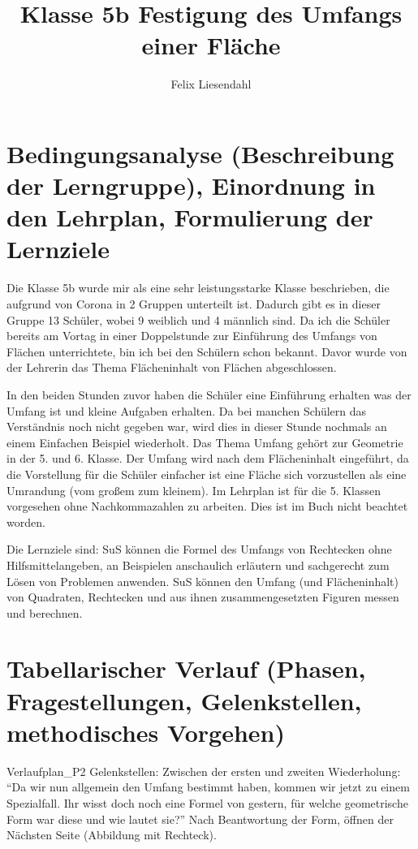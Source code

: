 \documentclass[11pt]{scrartcl}
\title{Klasse 5b Festigung des Umfangs einer Fläche}
\author{Felix Liesendahl}
\begin{document}
\maketitle
\tableofcontents
\newpage

\section{Bedingungsanalyse (Beschreibung der Lerngruppe), Einordnung in den Lehrplan, Formulierung der Lernziele}
Die Klasse 5b wurde mir als eine sehr leistungsstarke Klasse beschrieben, die aufgrund von Corona in 2 Gruppen unterteilt ist. Dadurch gibt es in dieser Gruppe 13 Schüler, wobei 9 weiblich und 4 männlich sind.
Da ich die Schüler bereits am Vortag in einer Doppelstunde zur Einführung des Umfangs von Flächen unterrichtete, bin ich bei den Schülern schon bekannt. Davor wurde von der Lehrerin das Thema Flächeninhalt von Flächen abgeschlossen.

In den beiden Stunden zuvor haben die Schüler eine Einführung erhalten was der Umfang ist und kleine Aufgaben erhalten. Da bei manchen Schülern das Verständnis noch nicht gegeben war, wird dies in dieser Stunde nochmals an einem Einfachen Beispiel wiederholt.
Das Thema Umfang gehört zur Geometrie in der 5. und 6. Klasse. Der Umfang wird nach dem Flächeninhalt eingeführt, da die Vorstellung für die Schüler einfacher ist eine Fläche sich vorzustellen als eine Umrandung (vom großem zum kleinem). Im Lehrplan ist für die 5. Klassen vorgesehen ohne Nachkommazahlen zu arbeiten. Dies ist im Buch nicht beachtet worden.

Die Lernziele sind:
SuS können die Formel des Umfangs von Rechtecken ohne Hilfsmittelangeben, an Beispielen anschaulich erläutern und sachgerecht zum Lösen von Problemen anwenden. SuS können den Umfang (und Flächeninhalt) von Quadraten, Rechtecken und aus ihnen zusammengesetzten Figuren messen und berechnen.

\newpage
\section{Tabellarischer Verlauf (Phasen, Fragestellungen, Gelenkstellen, methodisches Vorgehen)}
 {Verlaufplan_P2}
Gelenkstellen: Zwischen der ersten und zweiten Wiederholung:
\enquote{Da wir nun allgemein den Umfang bestimmt haben, kommen wir jetzt zu einem Spezialfall. Ihr wisst doch noch eine Formel von gestern, für welche geometrische Form war diese und wie lautet sie?} Nach Beantwortung der Form, öffnen der Nächsten Seite (Abbildung mit Rechteck).
\end{document}
